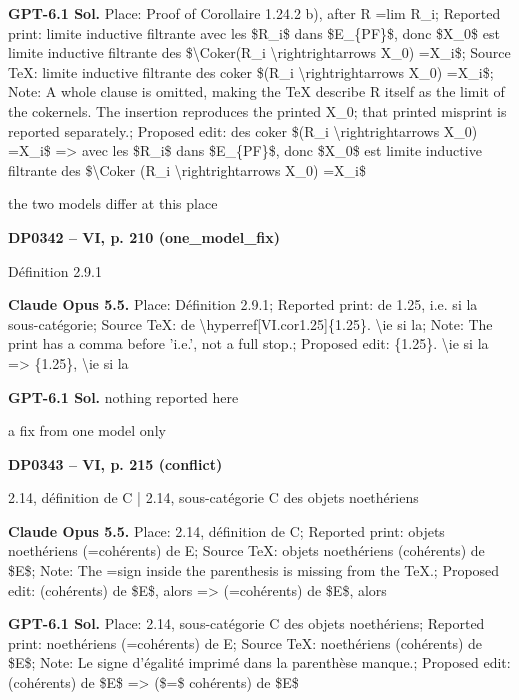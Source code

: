 \textbf{GPT-6.1 Sol.} Place: Proof of Corollaire 1.24.2 b), after R =\allowbreak  lim R\_i; Reported print: limite inductive filtrante avec les \$R\_i\$ dans \$E\_\{PF\}\$, donc \$X\_0\$ est limite inductive filtrante des \$\textbackslash{}Coker(R\_i \textbackslash{}rightrightarrows X\_0) =\allowbreak  X\_i\$; Source TeX: limite inductive filtrante des coker \$(R\_i \textbackslash{}rightrightarrows X\_0) =\allowbreak  X\_i\$; Note: A whole clause is omitted, making the TeX describe R itself as the limit of the cokernels. The insertion reproduces the printed X\_0; that printed misprint is reported separately.; Proposed edit: des coker \$(R\_i \textbackslash{}rightrightarrows X\_0) =\allowbreak  X\_i\$ =\allowbreak > avec les \$R\_i\$ dans \$E\_\{PF\}\$, donc \$X\_0\$ est limite inductive filtrante des \$\textbackslash{}Coker (R\_i \textbackslash{}rightrightarrows X\_0) =\allowbreak  X\_i\$\par
the two models differ at this place\par
\par\noindent\hypertarget{DP0342}{}\textbf{DP0342 -- VI, p. 210 (one\_model\_fix)}\par
Définition 2.9.1\par
\textbf{Claude Opus 5.5.} Place: Définition 2.9.1; Reported print: de 1.25, i.e. si la sous-catégorie; Source TeX: de \textbackslash{}hyperref[VI.cor1.25]\{1.25\}. \textbackslash{}ie si la; Note: The print has a comma before 'i.e.', not a full stop.; Proposed edit: \{1.25\}. \textbackslash{}ie si la =\allowbreak > \{1.25\}, \textbackslash{}ie si la\par
\textbf{GPT-6.1 Sol.} nothing reported here\par
a fix from one model only\par
\par\noindent\hypertarget{DP0343}{}\textbf{DP0343 -- VI, p. 215 (conflict)}\par
2.14, définition de C | 2.14, sous-catégorie C des objets noethériens\par
\textbf{Claude Opus 5.5.} Place: 2.14, définition de C; Reported print: objets noethériens (=\allowbreak  cohérents) de E; Source TeX: objets noethériens (cohérents) de \$E\$; Note: The =\allowbreak  sign inside the parenthesis is missing from the TeX.; Proposed edit: (cohérents) de \$E\$, alors =\allowbreak > (=\allowbreak  cohérents) de \$E\$, alors\par
\textbf{GPT-6.1 Sol.} Place: 2.14, sous-catégorie C des objets noethériens; Reported print: noethériens (=\allowbreak  cohérents) de E; Source TeX: noethériens (cohérents) de \$E\$; Note: Le signe d’égalité imprimé dans la parenthèse manque.; Proposed edit: (cohérents) de \$E\$ =\allowbreak > (\$=\allowbreak \$ cohérents) de \$E\$\par
